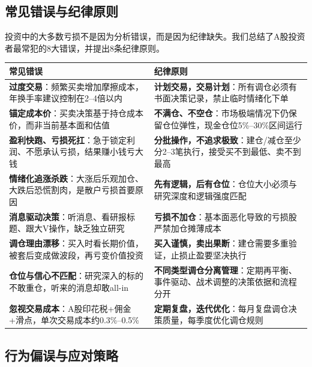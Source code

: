 \subsection{常见错误与纪律原则}

投资中的大多数亏损不是因为分析错误，而是因为纪律缺失。我们总结了A股投资者最常犯的8大错误，并提出8条纪律原则。

\begin{exhibitbox}[表9-29：常见调仓错误与纪律原则]
\scriptsize
\setlength{\tabcolsep}{3pt}
\renewcommand{\arraystretch}{1.12}
\begin{tabularx}{\textwidth}{X X}
\toprule
\textbf{常见错误} & \textbf{纪律原则} \\
\midrule
\textbf{过度交易}：频繁买卖增加摩擦成本，年换手率建议控制在2--4倍以内 & \textbf{计划交易，交易计划}：所有调仓必须有书面决策记录，禁止临时情绪化下单 \\
\midrule
\textbf{锚定成本价}：买卖决策基于持仓成本价，而非当前基本面和估值 & \textbf{不满仓、不空仓}：市场极端情况下仍保留仓位弹性，现金仓位5\%--30\%区间运行 \\
\midrule
\textbf{盈利快跑、亏损死扛}：急于锁定利润、不愿承认亏损，结果赚小钱亏大钱 & \textbf{分批操作，不追求极致}：建仓/减仓至少分2--3笔执行，接受买不到最低、卖不到最高 \\
\midrule
\textbf{情绪化追涨杀跌}：大涨后乐观加仓、大跌后恐慌割肉，是散户亏损首要原因 & \textbf{先有逻辑，后有仓位}：仓位大小必须与研究深度和逻辑强度匹配 \\
\midrule
\textbf{消息驱动决策}：听消息、看研报标题、跟大V操作，缺乏独立研究 & \textbf{亏损不加仓}：基本面恶化导致的亏损股严禁加仓摊薄成本 \\
\midrule
\textbf{调仓理由漂移}：买入时看长期价值，被套后变成做波段，再亏变价值投资 & \textbf{买入谨慎，卖出果断}：建仓需要多重验证，止损止盈要坚决执行 \\
\midrule
\textbf{仓位与信心不匹配}：研究深入的标的不敢重仓，听来的消息却敢all-in & \textbf{不同类型调仓分离管理}：定期再平衡、事件驱动、战术调整的决策依据和流程分开 \\
\midrule
\textbf{忽视交易成本}：A股印花税+佣金+滑点，单次交易成本约0.3\%--0.5\% & \textbf{定期复盘，迭代优化}：每月复盘调仓决策质量，每季度优化调仓规则 \\
\bottomrule
\end{tabularx}
\end{exhibitbox}

\subsection{行为偏误与应对策略}


